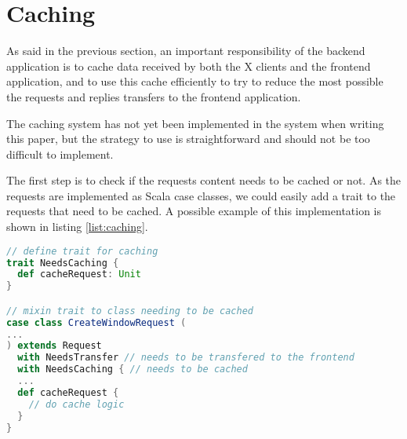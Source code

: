 \section{Caching}
%
As said in the previous section, an important responsibility of the backend application is to
cache data received by both the X clients and the frontend application, and to use this cache 
efficiently to try to reduce the most possible the requests and replies transfers to the 
frontend application.

The caching system has not yet been implemented in the system when writing this paper, but the 
strategy to use is straightforward and should not be too difficult to implement.

The first step is to check if the requests content needs to be cached or not. 
As the requests are implemented as Scala case classes, we could easily add a trait 
to the requests that need to be cached. A possible example of this implementation is shown 
in listing \ref{list:caching}.

\begin{lstlisting}[basicstyle=\footnotesize,caption=Possible implementation of requests needing cached,language=scala,label=list:caching]
// define trait for caching
trait NeedsCaching {
  def cacheRequest: Unit
}

// mixin trait to class needing to be cached
case class CreateWindowRequest (
...
) extends Request 
  with NeedsTransfer // needs to be transfered to the frontend
  with NeedsCaching { // needs to be cached 
  ...
  def cacheRequest {
    // do cache logic
  }
}
\end{lstlisting}

